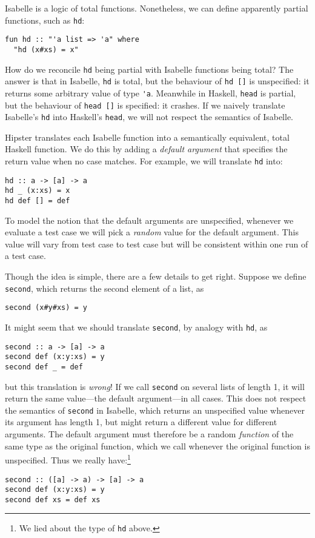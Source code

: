 Isabelle is a logic of total functions. Nonetheless, we can define
apparently partial functions, such as \verb|hd|:
\begin{verbatim}
fun hd :: "'a list => 'a" where
  "hd (x#xs) = x"
\end{verbatim}

How do we reconcile \verb|hd| being partial with Isabelle functions
being total? The answer is that in Isabelle, \verb|hd| is total, but
the behaviour of \verb|hd []| is unspecified: it returns some
arbitrary value of type \verb|'a|. Meanwhile in Haskell, \verb|head|
is partial, but the behaviour of \verb|head []| is specified: it
crashes. If we naively translate Isabelle's \verb|hd| into Haskell's
\verb|head|, we will not respect the semantics of Isabelle.

Hipster translates each Isabelle function into a semantically
equivalent, total Haskell function. We do this by adding
a \emph{default argument} that specifies the return value when no case
matches. For example, we will translate \verb|hd| into:
\begin{verbatim}
hd :: a -> [a] -> a
hd _ (x:xs) = x
hd def [] = def
\end{verbatim}
To model the notion that the default arguments are unspecified,
whenever we evaluate a test case we will pick a \emph{random} value
for the default argument. This value will vary from test case to test
case but will be consistent within one run of a test case.

Though the idea is simple, there are a few details to get right.
Suppose we define \verb|second|, which returns the second element of a list, as
\begin{verbatim}
second (x#y#xs) = y
\end{verbatim}
It might seem that we should translate \verb|second|, by analogy with \verb|hd|, as
\begin{verbatim}
second :: a -> [a] -> a
second def (x:y:xs) = y
second def _ = def
\end{verbatim}
but this translation is \emph{wrong}! If we call \verb|second| on
several lists of length 1, it will return the same value---the default
argument---in all cases. This does not respect the semantics of \verb|second|
in Isabelle, which returns an unspecified value whenever its argument
has length 1, but might return a different value for different arguments.
The default argument must therefore be a random \emph{function}
of the same type as the original function, which we call whenever the
original function is unspecified. Thus we really have:\footnote{We lied
about the type of \texttt{hd} above.}
\begin{verbatim}
second :: ([a] -> a) -> [a] -> a
second def (x:y:xs) = y
second def xs = def xs
\end{verbatim}

